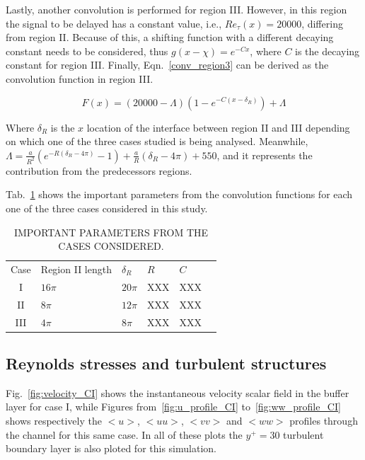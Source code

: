\documentclass[twocolumn,10pt]{asme2e}
\begin{document}
Lastly, another convolution is performed for region III. However, in this region the signal to be delayed has a constant value, i.e., \(Re_{\tau}(x)=20000\), differing from region II. Because of this, a shifting function with a different decaying constant needs to be considered, thus \(g(x-\chi)=e^{-Cx}\), where \(C\) is the decaying constant for region III. Finally, Eqn.~\ref{conv_region3} can be derived as the convolution function in region III.

\begin{equation}
F(x)= (20000-{\Lambda})(1-e^{-C(x-{\delta}_{R})})+{\Lambda}
\label{conv_region3}
\end{equation}

Where \({\delta}_{R}\) is the \(x\) location of the interface between region II and III depending on which one of the three cases studied is being analysed. Meanwhile, \({\Lambda}=\frac{a}{R^2}(e^{-R({\delta}_{R}-4{\pi})}-1)+\frac{a}{R}({\delta}_{R}-4{\pi})+550\), and it represents the contribution from the predecessors regions.

Tab.~\ref{table_conv} shows the important parameters from the convolution functions for each one of the three cases considered in this study.

\begin{table}[t]
\caption{IMPORTANT PARAMETERS FROM THE CASES CONSIDERED.}
\begin{center}
\centering
\label{table_conv}
\begin{tabular}{c l l l l l}
& & & & \\ %
\hline
Case	&	Region II length	&	\({\delta}_R\)	&	\(R\)	&	\(C\) \\
\hline
I	&	        \(16{\pi}\)	&	\(20{\pi}\)	&	XXX	&	XXX \\
II	&	        \(8{\pi}\)		&	\(12{\pi}\)	&	XXX	&	XXX \\
III	&	        \(4{\pi}\)		&	\(8{\pi}\)	&	XXX	&	XXX \\
\hline
\end{tabular}
\end{center}
\end{table}

\subsection*{Reynolds stresses and turbulent structures}

Fig.~\ref{fig:velocity_CI} shows the instantaneous velocity scalar field in the buffer layer for case I, while Figures from~\ref{fig:u_profile_CI} to~\ref{fig:ww_profile_CI} shows respectively the \(<u>\), \(<uu>\), \(<vv>\) and  \(<ww>\) profiles through the channel for this same case. In all of these plots the \(y^+=30\) turbulent boundary layer is also ploted for this simulation.
\end{document}
